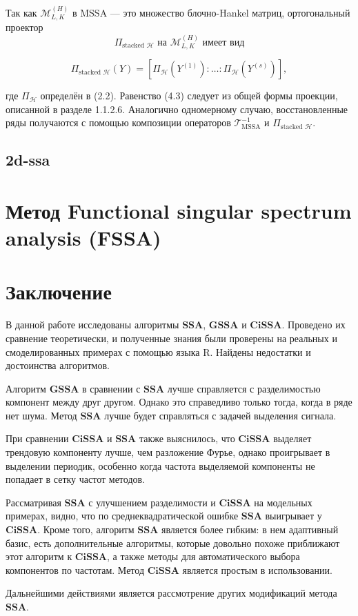 \documentclass[a4paper, 11pt]{article}
\newcommand{\SSA}{\textbf{SSA}}
\newcommand{\GSSA}{\textbf{GSSA}}
\newcommand{\CISSA}{\textbf{CiSSA}}
\begin{document}
Так как $\mathcal{M}_{L,K}^{(H)}$ в MSSA — это множество блочно-Hankel матриц, ортогональный проектор 
\[
\Pi_{\text{stacked } \mathcal{H}} \text{ на } \mathcal{M}_{L,K}^{(H)} \text{ имеет вид}
\]

\[
\Pi_{\text{stacked } \mathcal{H}}(Y) = [\Pi_{\mathcal{H}}(Y^{(1)}) : \ldots : \Pi_{\mathcal{H}}(Y^{(s)})],
\]

где $\Pi_{\mathcal{H}}$ определён в (2.2). Равенство (4.3) следует из общей формы проекции, описанной в разделе 1.1.2.6. Аналогично одномерному случаю, восстановленные ряды получаются с помощью композиции операторов $\mathcal{T}^{-1}_{\text{MSSA}}$ и $\Pi_{\text{stacked } \mathcal{H}}$.


\subsection{2d-ssa}


\section{Метод Functional singular spectrum analysis (FSSA)}







\newpage

\section{Заключение}
\label{sec:concl}


В данной работе исследованы алгоритмы $\SSA$, $\GSSA$ и $\CISSA$. Проведено их сравнение теоретически, и полученные
знания были проверены на реальных и смоделированных примерах с помощью языка R. Найдены недостатки и достоинства алгоритмов.

Алгоритм $\GSSA$ в сравнении с $\SSA$ лучше справляется с разделимостью  компонент между друг другом. Однако это справедливо только тогда, когда в ряде нет шума. Метод $\SSA$ лучше будет справляться с задачей выделения сигнала.

При сравнении $\CISSA$ и $\SSA$ также выяснилось, что $\CISSA$ выделяет трендовую компоненту лучше, чем разложение Фурье, однако проигрывает в выделении периодик, особенно когда частота выделяемой компоненты не попадает в сетку частот методов. 

Рассматривая $\SSA$ с улучшением разделимости и $\CISSA$ на модельных примерах, видно, что по среднеквадратической ошибке $\SSA$ выигрывает у $\CISSA$.
Кроме того, алгоритм $\SSA$ является более гибким: в нем адаптивный базис, есть дополнительные алгоритмы, которые довольно похоже приближают этот алгоритм к $\CISSA$, а также методы для автоматического выбора компонентов по частотам. Метод $\CISSA$ является простым в использовании.


Дальнейшими действиями является рассмотрение других модификаций метода $\SSA$.


\newpage



\end{document}
